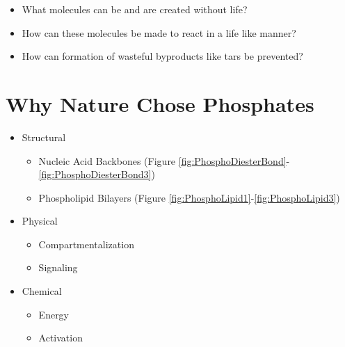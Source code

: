 \documentclass[]{article}
\begin{document}
\begin{itemize}
	\item What molecules can be and are created without life?
	\item How can these molecules be made to react in a life like manner?
	\item How can formation of wasteful byproducts like	tars be prevented?
\end{itemize}
\section{Why Nature Chose Phosphates}

\begin{itemize}
	\item Structural
	\begin{itemize}
		\item Nucleic Acid Backbones (Figure \ref{fig:PhosphoDiesterBond}-\ref{fig:PhosphoDiesterBond3})
		\item Phospholipid Bilayers (Figure \ref{fig:PhosphoLipid1}-\ref{fig:PhosphoLipid3})
	\end{itemize}

	\item Physical\begin{itemize}
		\item Compartmentalization
		\item Signaling
	\end{itemize}
	\item Chemical
	\begin{itemize}
		\item Energy
		\item Activation
	\end{itemize}
\end{itemize}
\end{document}
